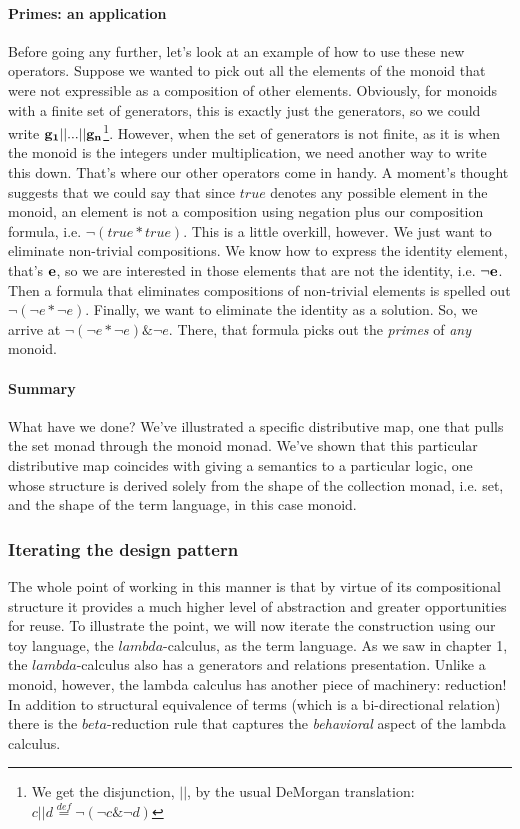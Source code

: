 \paragraph{Primes: an application}
Before going any further, let's look at an example of how to use these
new operators. Suppose we wanted to pick out all the elements of the
monoid that were not expressible as a composition of other
elements. Obviously, for monoids with a finite set of generators, this
is exactly just the generators, so we could write $\bf{g_1} || ... ||
\bf{g_n}$\footnote{We get the disjunction, $||$, by the usual DeMorgan
  translation: $c || d \stackrel{def}{=} \neg( \neg c \& \neg
  d)$}. However, when the set of generators is not finite, as it is
when the monoid is the integers under multiplication, we need another
way to write this down. That's where our other operators come in
handy. A moment's thought suggests that we could say that since $true$
denotes any possible element in the monoid, an element is not a
composition using negation plus our composition formula, i.e. $\neg
(true * true)$. This is a little overkill, however. We just want to
eliminate non-trivial compositions. We know how to express the
identity element, that's $\bf{e}$, so we are interested in those
elements that are not the identity, i.e. $\neg \bf{e}$. Then a formula
that eliminates compositions of non-trivial elements is spelled out
$\neg (\neg e * \neg e)$. Finally, we want to eliminate the identity
as a solution. So, we arrive at $\neg (\neg e * \neg e) \& \neg
e$. There, that formula picks out the \emph{primes} of \emph{any}
monoid.

\paragraph{Summary}

What have we done? We've illustrated a specific distributive map, one
that pulls the set monad through the monoid monad. We've shown that
this particular distributive map coincides with giving a semantics to
a particular logic, one whose structure is derived solely from the
shape of the collection monad, i.e. set, and the shape of the term
language, in this case monoid.

\subsubsection{Iterating the design pattern}

The whole point of working in this manner is that by virtue of its
compositional structure it provides a much higher level of abstraction
and greater opportunities for reuse. To illustrate the point, we will
now iterate the construction using our toy language, the
$lambda$-calculus, as the term language. As we saw in chapter 1, the
$lambda$-calculus also has a generators and relations
presentation. Unlike a monoid, however, the lambda calculus has
another piece of machinery: reduction! In addition to structural
equivalence of terms (which is a bi-directional relation) there is the
$beta$-reduction rule that captures the \emph{behavioral} aspect of
the lambda calculus.

